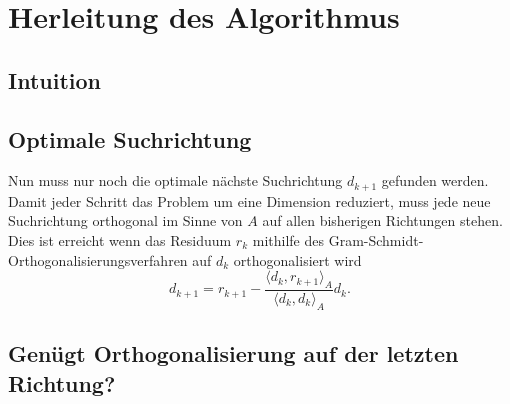 \section{Herleitung des Algorithmus}
\label{cg:section:herleitung}

\subsection{Intuition}

\subsection{Optimale Suchrichtung \label{cg:subsection:suchrichtung}}

Nun muss nur noch die optimale nächste Suchrichtung $d_{k+1}$ gefunden werden.
Damit jeder Schritt das Problem um eine Dimension reduziert, muss jede neue Suchrichtung orthogonal im Sinne von $A$ auf allen bisherigen Richtungen stehen. %
Dies ist erreicht wenn das Residuum $r_k$ mithilfe des Gram-Schmidt-Orthogonalisierungsverfahren auf $d_k$ orthogonalisiert wird %
\begin{equation}
d_{k+1}
= 
r_{k+1} - \frac{\langle d_k , r_{k+1} \rangle_A}{\langle d_k , d_k \rangle_A} d_k.
\end{equation}

\subsection{Genügt Orthogonalisierung auf der letzten Richtung?}

